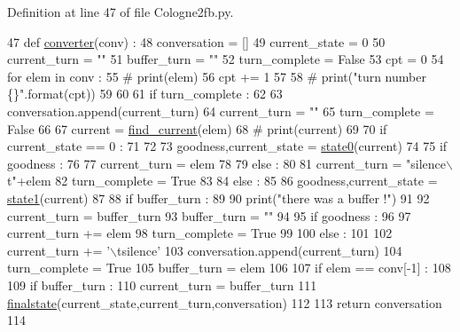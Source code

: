 Definition at line 47 of file Cologne2fb.\+py.


\begin{DoxyCode}
47 \textcolor{keyword}{def }\hyperlink{namespaceparlai_1_1scripts_1_1Cologne2fb_a1600997b7fde85c597ea9ec986997276}{converter}(conv) : 
48     conversation = []
49     current\_state = 0
50     current\_turn = \textcolor{stringliteral}{""}
51     buffer\_turn = \textcolor{stringliteral}{""}
52     turn\_complete = \textcolor{keyword}{False}
53     cpt = 0
54     \textcolor{keywordflow}{for} elem \textcolor{keywordflow}{in} conv : 
55         \textcolor{comment}{# print(elem)}
56         cpt += 1 
57 
58         \textcolor{comment}{# print("turn number \{\}".format(cpt))     }
59 
60 
61         \textcolor{keywordflow}{if} turn\_complete : 
62 
63             conversation.append(current\_turn)
64             current\_turn = \textcolor{stringliteral}{""}
65             turn\_complete = \textcolor{keyword}{False}
66    
67         current = \hyperlink{namespaceparlai_1_1scripts_1_1Cologne2fb_a0769ed4e08e090e651516d1c4dd50b39}{find\_current}(elem)
68         \textcolor{comment}{# print(current)}
69 
70         \textcolor{keywordflow}{if} current\_state == 0 :
71 
72 
73             goodness,current\_state = \hyperlink{namespaceparlai_1_1scripts_1_1Cologne2fb_ac765067cc58a95632761e7cf25d552ca}{state0}(current)
74 
75             \textcolor{keywordflow}{if} goodness  : 
76 
77                 current\_turn = elem
78 
79             \textcolor{keywordflow}{else} : 
80             
81                 current\_turn = \textcolor{stringliteral}{"silence\(\backslash\)t"}+elem
82                 turn\_complete = \textcolor{keyword}{True}
83 
84         \textcolor{keywordflow}{else} : 
85 
86             goodness,current\_state = \hyperlink{namespaceparlai_1_1scripts_1_1Cologne2fb_a54d10b54a93975b9903bd789aa2b5b91}{state1}(current)
87 
88             \textcolor{keywordflow}{if} buffer\_turn : 
89 
90                 print(\textcolor{stringliteral}{"there was a buffer !"})
91                 
92                 current\_turn = buffer\_turn               
93                 buffer\_turn = \textcolor{stringliteral}{""}
94 
95             \textcolor{keywordflow}{if} goodness : 
96 
97                 current\_turn += elem
98                 turn\_complete = \textcolor{keyword}{True}
99             
100             \textcolor{keywordflow}{else} : 
101 
102                 current\_turn += \textcolor{stringliteral}{'\(\backslash\)tsilence'}
103                 conversation.append(current\_turn)
104                 turn\_complete = \textcolor{keyword}{True}
105                 buffer\_turn = elem
106 
107         \textcolor{keywordflow}{if} elem == conv[-1] :
108 
109             \textcolor{keywordflow}{if} buffer\_turn : 
110                 current\_turn = buffer\_turn
111             \hyperlink{namespaceparlai_1_1scripts_1_1Cologne2fb_afdd76596097051e6d1580703a4f2abe8}{finalstate}(current\_state,current\_turn,conversation)
112 
113     \textcolor{keywordflow}{return} conversation
114 
\end{DoxyCode}
